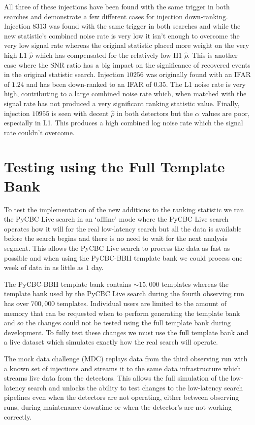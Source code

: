 %
All three of these injections have been found with the same trigger in both searches and demonstrate a few different cases for injection down-ranking. Injection $8313$ was found with the same trigger in both searches and while the new statistic's combined noise rate is very low it isn't enough to overcome the very low signal rate whereas the original statistic placed more weight on the very high L1 $\hat{\rho}$ which has compensated for the relatively low H1 $\hat{\rho}$. This is another case where the SNR ratio has a big impact on the significance of recovered events in the original statistic search. Injection $10256$ was originally found with an IFAR of $1.24$ and has been down-ranked to an IFAR of $0.35$. The L1 noise rate is very high, contributing to a large combined noise rate which, when matched with the signal rate has not produced a very significant ranking statistic value. Finally, injection $10955$ is seen with decent $\hat{\rho}$ in both detectors but the $\alpha$ values are poor, especially in L1. This produces a high combined log noise rate which the signal rate couldn't overcome. 

\section{\label{5:sec:mdc-test}Testing using the Full Template Bank}

To test the implementation of the new additions to the ranking statistic we ran the PyCBC Live search in an `offline' mode where the PyCBC Live search operates how it will for the real low-latency search but all the data is available before the search begins and there is no need to wait for the next analysis segment. This allows the PyCBC Live search to process the data as fast as possible and when using the PyCBC-BBH template bank we could process one week of \gwadj data in as little as $1$ day.

The PyCBC-BBH template bank contains ${\sim}15,000$ templates whereas the template bank used by the PyCBC Live search during the fourth observing run has over $700,000$ templates. Individual users are limited to the amount of memory that can be requested when to perform generating the template bank and so the changes could not be tested using the full template bank during development. To fully test these changes we must use the full template bank and a live dataset which simulates exactly how the real search will operate.

The \gwadj mock data challenge (MDC) replays data from the third observing run with a known set of injections and streams it to the same data infrastructure which streams live data from the \gwadj detectors. This allows the full simulation of the low-latency \gwadj search and unlocks the ability to test changes to the \gwadj low-latency search pipelines even when the \gwadj detectors are not operating, either between observing runs, during maintenance downtime or when the detector's are not working correctly.

